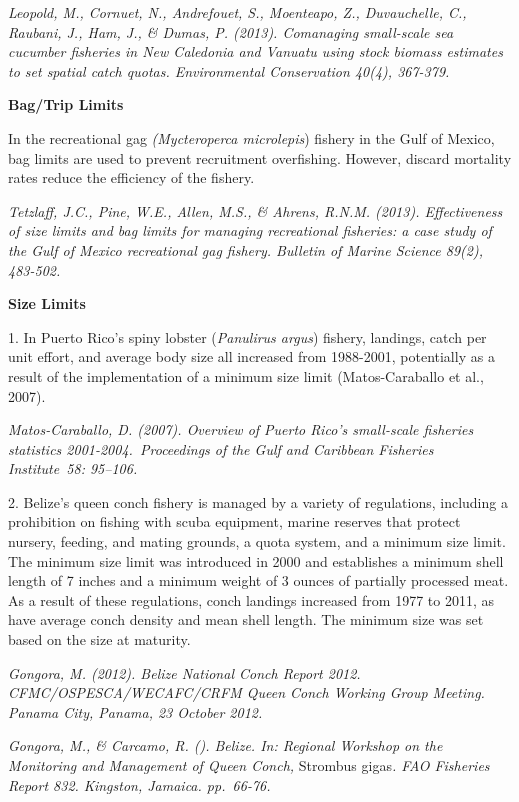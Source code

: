 \documentclass[]{book}
\begin{document}
\emph{Leopold, M., Cornuet, N., Andrefouet, S., Moenteapo, Z.,
Duvauchelle, C., Raubani, J., Ham, J., \& Dumas, P. (2013). Comanaging
small-scale sea cucumber fisheries in New Caledonia and Vanuatu using
stock biomass estimates to set spatial catch quotas. Environmental
Conservation 40(4), 367-379.}

\textbf{Bag/Trip Limits}

In the recreational gag \emph{(Mycteroperca microlepis}) fishery in the
Gulf of Mexico, bag limits are used to prevent recruitment overfishing.
However, discard mortality rates reduce the efficiency of the fishery.

\emph{Tetzlaff, J.C., Pine, W.E., Allen, M.S., \& Ahrens, R.N.M. (2013).
Effectiveness of size limits and bag limits for managing recreational
fisheries: a case study of the Gulf of Mexico recreational gag fishery.
Bulletin of Marine Science 89(2), 483-502.}

\textbf{Size Limits}

1. In Puerto Rico's spiny lobster (\emph{Panulirus argus}) fishery,
landings, catch per unit effort, and average body size all increased
from 1988-2001, potentially as a result of the implementation of a
minimum size limit (Matos-Caraballo et al., 2007).

\emph{Matos-Caraballo, D. (2007). Overview of Puerto Rico's small-scale
fisheries statistics 2001-2004.~Proceedings of the Gulf and Caribbean
Fisheries Institute~58: 95--106.}

2. Belize's queen conch fishery is managed by a variety of regulations,
including a prohibition on fishing with scuba equipment, marine reserves
that protect nursery, feeding, and mating grounds, a quota system, and a
minimum size limit. The minimum size limit was introduced in 2000 and
establishes a minimum shell length of 7 inches and a minimum weight of 3
ounces of partially processed meat. As a result of these regulations,
conch landings increased from 1977 to 2011, as have average conch
density and mean shell length. The minimum size was set based on the
size at maturity.

\emph{Gongora, M. (2012). Belize National Conch Report 2012.
CFMC/OSPESCA/WECAFC/CRFM Queen Conch Working Group Meeting. Panama City,
Panama, 23 October 2012.}

\emph{Gongora, M., \& Carcamo, R. (). Belize. In: Regional Workshop on
the Monitoring and Management of Queen Conch,} Strombus gigas\emph{. FAO
Fisheries Report 832. Kingston, Jamaica. pp.~66-76.}
\end{document}
